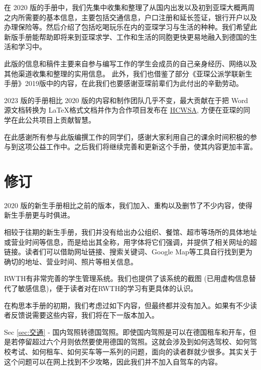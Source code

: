   在 2020 版的手册中，我们先集中收集和整理了从国内出发以及初到亚琛大概两周之内所需要的基本信息，主要包括交通信息，户口注册和延长签证，银行开户以及办理保险等。然后介绍了包括吃喝玩乐在内的亚琛学习与生活的种种。我们希望此新版手册能帮助即将来到亚琛求学、工作和生活的同胞更快更易地融入到德国的生活和学习中。

  此版的信息和稿件主要来自参与编写工作的学生会成员的自己亲身经历、网络以及其他渠道收集和整理的实用信息。 此外，我们也借鉴了部分《亚琛公派学联新生手册》2019版中的内容，在此我们也要感谢亚琛前辈们为此付出的辛勤劳动。

  2023 版的手册相比 2020 版的内容和制作团队几乎不变，最大贡献在于把 Word 源文档转换为 \LaTeX 格式文档并作为合作项目发布在 \href{https://github.com/OChicken/HCWSA}{HCWSA}, 方便在亚琛的同学在此公共项目上贡献智慧。

  在此感谢所有参与此版编撰工作的同学们，感谢大家利用自己的课余时间积极的参与到这项公益工作中。之后我们将继续完善和更新这个手册，使其内容更加丰富。



  \newpage

\chapter*{修订}


  2020 版的新生手册相比之前的版本，我们加入、重构以及删节了不少内容，使得新生手册更与时俱进。

  相较于往期的新生手册，我们并没有给出办公组织、餐馆、超市等场所的具体地址或营业时间等信息，而是给出其全称，用字体将它们强调，并提供了相关网址的超链接。读者们可以借助网址链接、搜索关键词、Google Map等工具自行找到更为确切的地址、营业时间、照片等相关信息。

  RWTH有非常完善的学生管理系统。我们也提供了该系统的截图 (已用虚构信息替代了敏感信息)，便于读者对在RWTH的学习有更具体的认识。

  在构思本手册的初期，我们考虑过如下内容，但最终都并没有加入。如果有不少读者反馈说需要这些内容，我们将在下一版本加入。

  Sec \ref{sec:交通} - 国内驾照转德国驾照。即使国内驾照是可以在德国租车和开车，但是若停留超过六个月则依然要使用德国的驾照。这就会涉及到如何选驾校、如何驾校考试、如何租车、如何买车等一系列的问题，面向的读者群就少很多。其实关于这个问题可以在网上找到不少攻略，因此我们并不加入自驾车的内容。

